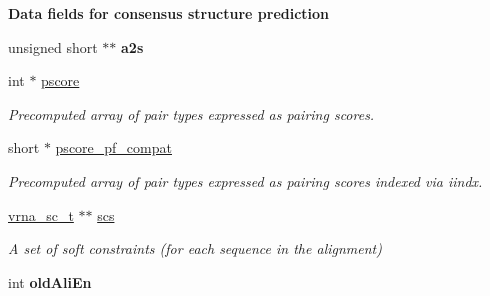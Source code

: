 \begin{Indent}{\bf Data fields for consensus structure prediction}
\begin{DoxyCompactItemize}
\item 
\hypertarget{group__fold__compound_a5804d22ecba317fa64246d41c961bf35}{unsigned short $\ast$$\ast$ {\bfseries a2s}}\label{group__fold__compound_a5804d22ecba317fa64246d41c961bf35}

\item 
int $\ast$ \hyperlink{group__fold__compound_a14dc7755af6019ddbd0cf94b209e89dd}{pscore}
\begin{DoxyCompactList}\small\item\em Precomputed array of pair types expressed as pairing scores. \end{DoxyCompactList}\item 
short $\ast$ \hyperlink{group__fold__compound_abf5e82d14649b6179ae60ed7da6e4fc0}{pscore\-\_\-pf\-\_\-compat}
\begin{DoxyCompactList}\small\item\em Precomputed array of pair types expressed as pairing scores indexed via iindx. \end{DoxyCompactList}\item 
\hyperlink{group__constraints_ga75401ce219ef8dbcceb672db82d434c6}{vrna\-\_\-sc\-\_\-t} $\ast$$\ast$ \hyperlink{group__fold__compound_ac2b047fddabc51a76a96511174e47db1}{scs}
\begin{DoxyCompactList}\small\item\em A set of soft constraints (for each sequence in the alignment) \end{DoxyCompactList}\item 
\hypertarget{group__fold__compound_ac539df9233472dd76d070f4a821185a9}{int {\bfseries old\-Ali\-En}}\label{group__fold__compound_ac539df9233472dd76d070f4a821185a9}

\end{DoxyCompactItemize}
\end{Indent}
